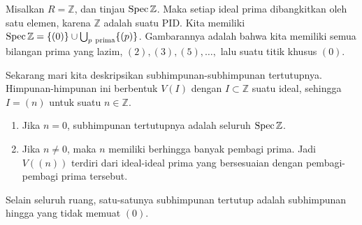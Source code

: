 \begin{example} 
Misalkan $R = \mathbb{Z}$, dan tinjau $\operatorname{Spec} \mathbb{Z}$. Maka
setiap ideal prima dibangkitkan oleh satu elemen, karena
$\mathbb{Z}$ adalah suatu PID. Kita memiliki $\operatorname{Spec} \mathbb{Z} = \{(0)\}
\cup \bigcup_{p \
\mathrm{prima}} \{ (p)\}$. Gambarannya adalah bahwa kita memiliki semua bilangan
prima yang lazim, $(2), (3),
(5), \dots, $ lalu suatu titik khusus $(0)$.

Sekarang mari kita deskripsikan subhimpunan-subhimpunan tertutupnya. Himpunan-himpunan ini berbentuk
$V(I)$ dengan $I
\subset \mathbb{Z}$ suatu ideal, sehingga $I = (n)$ untuk suatu $n \in
\mathbb{Z}$.

\begin{enumerate}
\item Jika $n=0$, subhimpunan tertutupnya adalah seluruh $\operatorname{Spec} \mathbb{Z}$.
\item Jika $n \neq 0$, maka $n$ memiliki berhingga banyak pembagi prima.
Jadi $V((n))$ terdiri
dari ideal-ideal prima yang bersesuaian dengan pembagi-pembagi prima tersebut.  
\end{enumerate}

Selain seluruh ruang, satu-satunya subhimpunan tertutup adalah subhimpunan
hingga
yang tidak memuat $(0)$.  
\end{example} 


